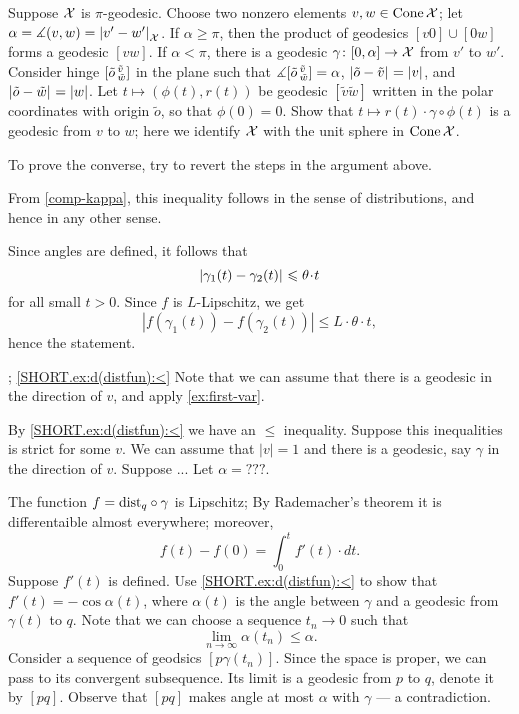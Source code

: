 Suppose $\mathcal{X}$ is $\pi$-geodesic.
Choose two nonzero elements $v,w\in\mathop{\rm Cone}\nolimits \mathcal{X}$; let $\alpha=\mangle(v,w)=\dist{v'}{w'}{\spc{X}}$.
If $\alpha\ge \pi$, then the product of geodesics $[v0]\cup [0w]$ forms a geodesic $[vw]$.
If $\alpha<\pi$, there is a geodesic $\gamma\colon[0,\alpha]\to \mathcal{X}$ from $v'$ to $w'$.
Consider hinge $[\tilde o\,{}^{\tilde v}_{\tilde w}]$ in the plane 
such that $\measuredangle[\tilde o\,{}^{\tilde v}_{\tilde w}]=\alpha$, $\dist{\tilde o}{\tilde v}{}=|v|$, and $\dist{\tilde o}{\tilde w}{}=|w|$.
Let $t\mapsto (\phi(t),r(t))$ be geodesic $[\tilde v\tilde w]$ written in the polar coordinates with origin $\tilde o$, so that $\phi(0)=0$.
Show that $t\mapsto r(t)\cdot\gamma\circ\phi(t)$ is a geodesic from $v$ to $w$;
here we identify $\mathcal{X}$ with the unit sphere in $\mathop{\rm Cone}\nolimits \mathcal{X}$.

To prove the converse, try to revert the steps in the argument above.


 From \ref{comp-kappa}, this inequality follows in the sense of distributions, and hence in any other sense.

Since angles are defined, it follows that 
\[\dist{\gamma_1(t)}{\gamma_2(t)}{}\le \theta\cdot t\]
for all small $t>0$.
Since $f$ is $L$-Lipschitz, we get 
\[|f(\gamma_1(t))-f(\gamma_2(t))|\le L\cdot \theta\cdot t,\]
hence the statement.

\parbf{\ref{ex:d(distfun)}}; \ref{SHORT.ex:d(distfun):<}
Note that we can assume that there is a geodesic in the direction of $v$, and apply \ref{ex:first-var}.

By \ref{SHORT.ex:d(distfun):<} we have an $\le$ inequality.
Suppose this inequalities is strict for some $v$.
We can assume that $|v|=1$ and there is a geodesic, say $\gamma$ in the direction of $v$.
Suppose ...
Let $\alpha=???$.

The function $f=\mathrm{dist}_q\circ\gamma$ is Lipschitz;
By Rademacher's theorem it is differentaible almost everywhere;
moreover, 
\[f(t)-f(0)=\int_0^t f'(t)\cdot dt.\]
Suppose $f'(t)$ is defined.
Use \ref{SHORT.ex:d(distfun):<} to show that 
$f'(t)=-\cos\alpha(t)$, where $\alpha(t)$ is the angle between $\gamma$ and a geodesic from $\gamma(t)$ to $q$.
Note that we can choose a sequence $t_n\to 0$ such that 
\[\lim_{n\to\infty}\alpha(t_n) \le \alpha.\]
Consider a sequence of geodsics $[p\gamma(t_n)]$.
Since the space is proper, we can pass to its convergent subsequence.
Its limit is a geodesic from $p$ to $q$, denote it by $[pq]$.
Observe that $[pq]$ makes angle at most $\alpha$ with $\gamma$ --- a contradiction.
 
